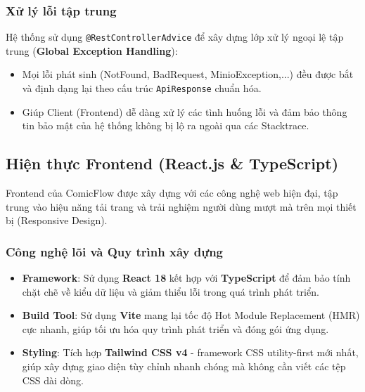 \subsubsection{Xử lý lỗi tập trung}
Hệ thống sử dụng \texttt{@RestControllerAdvice} để xây dựng lớp xử lý ngoại lệ tập trung (\textbf{Global Exception Handling}):
\begin{itemize}
    \item Mọi lỗi phát sinh (NotFound, BadRequest, MinioException,...) đều được bắt và định dạng lại theo cấu trúc \texttt{ApiResponse} chuẩn hóa.
    \item Giúp Client (Frontend) dễ dàng xử lý các tình huống lỗi và đảm bảo thông tin bảo mật của hệ thống không bị lộ ra ngoài qua các Stacktrace.
\end{itemize}

\subsection{Hiện thực Frontend (React.js \& TypeScript)}
Frontend của ComicFlow được xây dựng với các công nghệ web hiện đại, tập trung vào hiệu năng tải trang và trải nghiệm người dùng mượt mà trên mọi thiết bị (Responsive Design).

\subsubsection{Công nghệ lõi và Quy trình xây dựng}
\begin{itemize}
    \item \textbf{Framework}: Sử dụng \textbf{React 18} kết hợp với \textbf{TypeScript} để đảm bảo tính chặt chẽ về kiểu dữ liệu và giảm thiểu lỗi trong quá trình phát triển.
    \item \textbf{Build Tool}: Sử dụng \textbf{Vite} mang lại tốc độ Hot Module Replacement (HMR) cực nhanh, giúp tối ưu hóa quy trình phát triển và đóng gói ứng dụng.
    \item \textbf{Styling}: Tích hợp \textbf{Tailwind CSS v4} - framework CSS utility-first mới nhất, giúp xây dựng giao diện tùy chỉnh nhanh chóng mà không cần viết các tệp CSS dài dòng.
\end{itemize}

